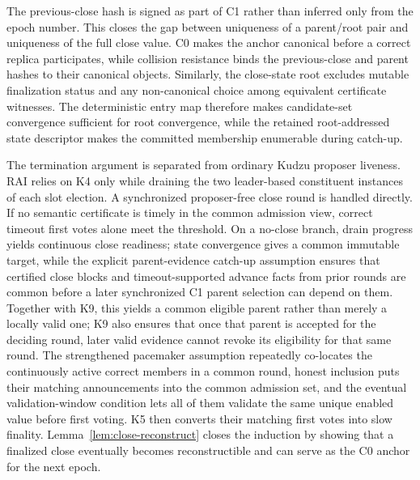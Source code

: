 \documentclass[11pt]{article}
\theoremstyle{definition}
\theoremstyle{remark}
\begin{document}
The previous-close hash is signed as part of C1 rather than inferred only from the epoch number. This closes the gap between uniqueness of a parent/root pair and uniqueness of the full close value. C0 makes the anchor canonical before a correct replica participates, while collision resistance binds the previous-close and parent hashes to their canonical objects. Similarly, the close-state root excludes mutable finalization status and any non-canonical choice among equivalent certificate witnesses. The deterministic entry map therefore makes candidate-set convergence sufficient for root convergence, while the retained root-addressed state descriptor makes the committed membership enumerable during catch-up.

The termination argument is separated from ordinary Kudzu proposer liveness. RAI relies on K4 only while draining the two leader-based constituent instances of each slot election. A synchronized proposer-free close round is handled directly. If no semantic certificate is timely in the common admission view, correct timeout first votes alone meet the threshold. On a no-close branch, drain progress yields continuous close readiness; state convergence gives a common immutable target, while the explicit parent-evidence catch-up assumption ensures that certified close blocks and timeout-supported advance facts from prior rounds are common before a later synchronized C1 parent selection can depend on them. Together with K9, this yields a common eligible parent rather than merely a locally valid one; K9 also ensures that once that parent is accepted for the deciding round, later valid evidence cannot revoke its eligibility for that same round. The strengthened pacemaker assumption repeatedly co-locates the continuously active correct members in a common round, honest inclusion puts their matching announcements into the common admission set, and the eventual validation-window condition lets all of them validate the same unique enabled value before first voting. K5 then converts their matching first votes into slow finality. Lemma~\ref{lem:close-reconstruct} closes the induction by showing that a finalized close eventually becomes reconstructible and can serve as the C0 anchor for the next epoch.
\end{document}
